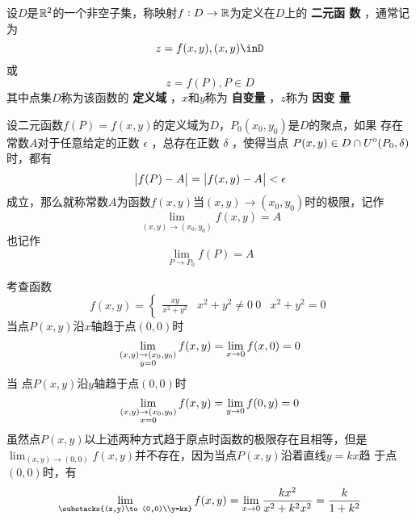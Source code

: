 \documentclass[11pt]{article}
\begin{document}
\begin{definition}[]
设\(D\)是\(\mathbb{R}^2\)的一个非空子集，称映射\(f:D\to\mathbb{R}\)为定义在\(D\)上的 \textbf{二元函
数} ，通常记为
\begin{equation*}
z=f(x,y),(x,y)\inD
\end{equation*}
或
\begin{equation*}
z=f(P),P\in D
\end{equation*}
其中点集\(D\)称为该函数的 \textbf{定义域} ，\(x\)和\(y\)称为 \textbf{自变量} ，\(z\)称为 \textbf{因变
量}
\end{definition}

\begin{definition}[]
设二元函数\(f(P)=f(x,y)\)的定义域为\(D\)，\(P_0(x_0,y_0)\)是\(D\)的聚点，如果
存在常数\(A\)对于任意给定的正数 \(\epsilon\) ，总存在正数 \(\delta\) ，使得当点
\(P(x,y)\in D\cap{\kern0ptU}^{\mathrm{o}}(P_0,\delta)\)时，都有
\begin{equation*}
\abs{f(P)-A}=\abs{f(x,y)-A}<\epsilon
\end{equation*}
成立，那么就称常数\(A\)为函数\(f(x,y)\)当\((x,y)\to(x_0,y_0)\)时的极限，记作
\begin{equation*}
\lim_{(x,y)\to(x_0,y_0)}f(x,y)=A 
\end{equation*}
也记作
\begin{equation*}
\lim_{P\to P_0}f(P)=A
\end{equation*}
\end{definition}

考查函数
\begin{equation*}
f(x,y)=
\begin{cases}
\frac{xy}{x^2+y^2}&x^2+y^2\neq0\
0&x^2+y^2=0
\end{cases}
\end{equation*}
当点\(P(x,y)\)沿\(x\)轴趋于点\((0,0)\)时
\begin{equation*}
\lim_{\substack{(x,y)\to(x_0,y_0)\\y=0}}f(x,y)=\lim_{x\to0}f(x,0)=0\\
\end{equation*}
当 点\(P(x,y)\)沿\(y\)轴趋于点\((0,0)\)时
\begin{equation*}
\lim_{\substack{(x,y)\to(x_0,y_0)\\x=0}}f(x,y)=\lim_{y\to0}f(0,y)=0\\
\end{equation*}
虽然点\(P(x,y)\)以上述两种方式趋于原点时函数的极限存在且相等，但是
\(\lim_{(x,y)\to(0,0)}f(x,y)\)并不存在，因为当点\(P(x,y)\)沿着直线\(y=kx\)趋
于点\((0,0)\)时，有
\begin{equation*}
\lim_{\substacks{(x,y)\to(0,0)\\y=kx}}f(x,y)=
\lim_{x\to0}\frac{kx^2}{x^2+k^2x^2}=\frac{k}{1+k^2}
\end{equation*}
\end{document}
